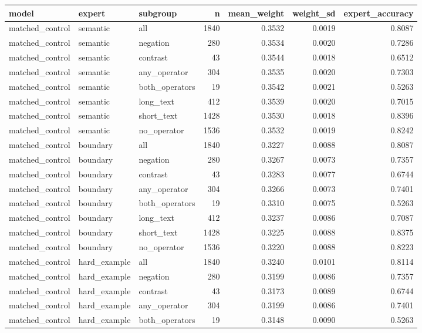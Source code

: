 \begin{tabular}{lllrrrr}
\toprule
model & expert & subgroup & n & mean\_weight & weight\_sd & expert\_accuracy \\
\midrule
matched\_control & semantic & all & 1840 & 0.3532 & 0.0019 & 0.8087 \\
matched\_control & semantic & negation & 280 & 0.3534 & 0.0020 & 0.7286 \\
matched\_control & semantic & contrast & 43 & 0.3544 & 0.0018 & 0.6512 \\
matched\_control & semantic & any\_operator & 304 & 0.3535 & 0.0020 & 0.7303 \\
matched\_control & semantic & both\_operators & 19 & 0.3542 & 0.0021 & 0.5263 \\
matched\_control & semantic & long\_text & 412 & 0.3539 & 0.0020 & 0.7015 \\
matched\_control & semantic & short\_text & 1428 & 0.3530 & 0.0018 & 0.8396 \\
matched\_control & semantic & no\_operator & 1536 & 0.3532 & 0.0019 & 0.8242 \\
matched\_control & boundary & all & 1840 & 0.3227 & 0.0088 & 0.8087 \\
matched\_control & boundary & negation & 280 & 0.3267 & 0.0073 & 0.7357 \\
matched\_control & boundary & contrast & 43 & 0.3283 & 0.0077 & 0.6744 \\
matched\_control & boundary & any\_operator & 304 & 0.3266 & 0.0073 & 0.7401 \\
matched\_control & boundary & both\_operators & 19 & 0.3310 & 0.0075 & 0.5263 \\
matched\_control & boundary & long\_text & 412 & 0.3237 & 0.0086 & 0.7087 \\
matched\_control & boundary & short\_text & 1428 & 0.3225 & 0.0088 & 0.8375 \\
matched\_control & boundary & no\_operator & 1536 & 0.3220 & 0.0088 & 0.8223 \\
matched\_control & hard\_example & all & 1840 & 0.3240 & 0.0101 & 0.8114 \\
matched\_control & hard\_example & negation & 280 & 0.3199 & 0.0086 & 0.7357 \\
matched\_control & hard\_example & contrast & 43 & 0.3173 & 0.0089 & 0.6744 \\
matched\_control & hard\_example & any\_operator & 304 & 0.3199 & 0.0086 & 0.7401 \\
matched\_control & hard\_example & both\_operators & 19 & 0.3148 & 0.0090 & 0.5263 \\

\end{tabular}
